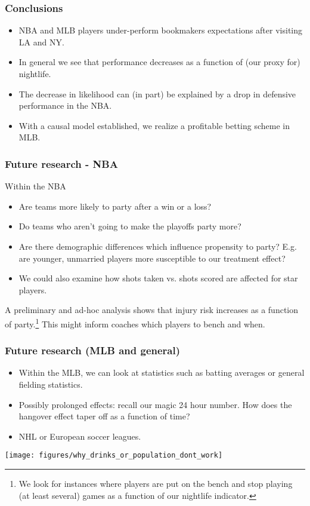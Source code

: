 \documentclass{beamer}
\begin{document}
\begin{frame}   \frametitle{Conclusions}
  \begin{itemize}
    \vspace{12pt}
    \item NBA and MLB players under-perform bookmakers expectations after visiting LA and NY.
    \vspace{12pt}
    \item In general we see that performance decreases as a function of (our proxy for) nightlife.     
    \vspace{12pt}
      \item The decrease in likelihood can (in part) be explained by a drop in defensive performance in the NBA.
    \vspace{12pt}
    \item With a causal model established, we realize a profitable betting scheme in MLB.   
  \end{itemize} 
\end{frame}


\begin{frame}   \frametitle{Future research - NBA}
  Within the NBA
  \begin{itemize}     
    \item Are teams more likely to party after a win or a       loss?
    \item Do teams who aren't going to make the playoffs party more?
    \item Are there demographic differences which influence propensity to party? E.g. are younger, unmarried players more susceptible to our treatment effect?
    \item We could also examine how shots taken vs. shots scored are affected for star players.
  \end{itemize}
  \vspace{12pt}  A preliminary and ad-hoc analysis shows that injury risk increases as a function of party.\footnote{We look for instances where players are put on the bench and stop playing (at least several) games as a function of our nightlife indicator.}
  This might inform coaches which players to bench and when.
\end{frame}

\begin{frame}   \frametitle{Future research (MLB and general)}
  \begin{itemize}     
    \item Within the MLB, we can look at statistics such as batting averages or general fielding statistics. 
    \vspace{12pt}
    \item Possibly prolonged effects: recall our magic 24 hour number.
      How does the hangover effect taper off as a function of time?
    \vspace{12pt}
    \item NHL or European soccer leagues.   
  \end{itemize} 
\end{frame}

\begin{frame}   
  \texttt{[image: figures/why\_drinks\_or\_population\_dont\_work]} \end{frame}
\end{document}
